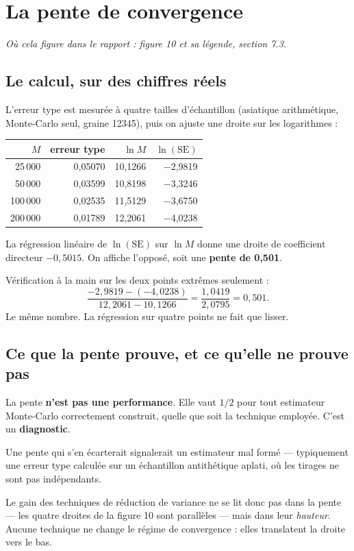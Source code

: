 \documentclass[11pt,a4paper]{article}
\newcommand{\ou}[1]{\textit{\small Où cela figure dans le rapport : #1}}
\begin{document}
\section{La pente de convergence}

\ou{figure 10 et sa légende, section 7.3.}

\subsection{Le calcul, sur des chiffres réels}

L'erreur type est mesurée à quatre tailles d'échantillon (asiatique
arithmétique, Monte-Carlo seul, graine 12345), puis on ajuste une droite sur
les logarithmes :

\begin{center}
\small
\begin{tabular}{rrrr}
\toprule
$M$ & erreur type & $\ln M$ & $\ln(\text{SE})$ \\
\midrule
25\,000  & 0,05070 & 10,1266 & $-$2,9819 \\
50\,000  & 0,03599 & 10,8198 & $-$3,3246 \\
100\,000 & 0,02535 & 11,5129 & $-$3,6750 \\
200\,000 & 0,01789 & 12,2061 & $-$4,0238 \\
\bottomrule
\end{tabular}
\end{center}

La régression linéaire de $\ln(\text{SE})$ sur $\ln M$ donne une droite de
coefficient directeur $-0{,}5015$. On affiche l'opposé, soit une
\textbf{pente de 0,501}.

Vérification à la main sur les deux points extrêmes seulement :
$$
\frac{-2{,}9819 - (-4{,}0238)}{12{,}2061 - 10{,}1266} = \frac{1{,}0419}{2{,}0795}
= 0{,}501 .
$$
Le même nombre. La régression sur quatre points ne fait que lisser.

\subsection{Ce que la pente prouve, et ce qu'elle ne prouve pas}

\begin{encadre}
La pente \textbf{n'est pas une performance}. Elle vaut $1/2$ pour tout
estimateur Monte-Carlo correctement construit, quelle que soit la technique
employée. C'est un \textbf{diagnostic}.

Une pente qui s'en écarterait signalerait un estimateur mal formé --- typiquement
une erreur type calculée sur un échantillon antithétique aplati, où les tirages
ne sont pas indépendants.

Le gain des techniques de réduction de variance ne se lit donc pas dans la
pente --- les quatre droites de la figure 10 sont parallèles --- mais dans leur
\emph{hauteur}. Aucune technique ne change le régime de convergence : elles
translatent la droite vers le bas.
\end{encadre}
\end{document}
